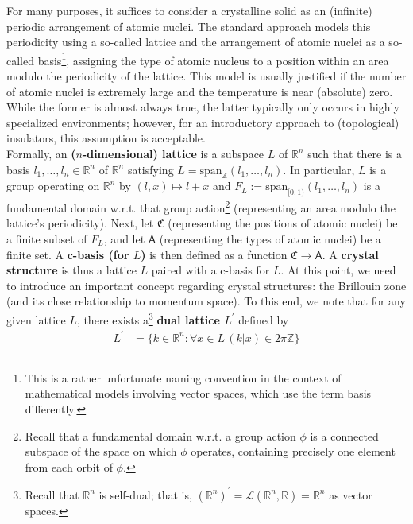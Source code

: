 For many purposes, it suffices to consider a crystalline solid as an (infinite) periodic arrangement of atomic nuclei.
The standard approach models this periodicity using a so-called lattice and the arrangement of atomic nuclei as a so-called basis\footnote{This is a rather unfortunate naming convention in the context of mathematical models involving vector spaces, which use the term {\glqq}basis{\grqq} differently.}, assigning the type of atomic nucleus to a position within an area modulo the periodicity of the lattice.
This model is usually justified if the number of atomic nuclei is extremely large and the temperature is near (absolute) zero.
While the former is almost always true, the latter typically only occurs in highly specialized environments; however, for an introductory approach to (topological) insulators, this assumption is acceptable.
\\
Formally, an \textbf{($n$-dimensional) lattice} is a subspace $L$ of $\mathbb{R}^{n}$ such that there is a basis $l_{1},\ldots,l_{n} \in \mathbb{R}^{n}$ of $\mathbb{R}^{n}$ satisfying $L = \mathrm{span}_{\mathbb{Z}}(l_{1},\ldots,l_{n})$. In particular, $L$ is a group operating on $\mathbb{R}^{n}$ by $(l,x) \mapsto l + x$ and $F_{L} := \mathrm{span}_{[0,1)}(l_{1},\ldots,l_{n})$ is a fundamental domain w.r.t. that group action\footnote{Recall that a fundamental domain w.r.t. a group action $\phi$ is a connected subspace of the space on which $\phi$ operates, containing precisely one element from each orbit of $\phi$.} (representing an area modulo the lattice's periodicity).
Next, let $\mathfrak{C}$ (representing the positions of atomic nuclei) be a finite subset of $F_{L}$, and let $\mathsf{A}$ (representing the types of atomic nuclei) be a finite set. A \textbf{c-basis (for $L$)} is then defined as a function $\mathfrak{C} \to \mathsf{A}$.
A \textbf{crystal structure} is thus a lattice $L$ paired with a c-basis for $L$.
At this point, we need to introduce an important concept regarding crystal structures: the Brillouin zone (and its close relationship to momentum space).
To this end, we note that for any given lattice $L$, there exists a\footnote{Recall that $\mathbb{R}^{n}$ is self-dual; that is, $(\mathbb{R}^{n})^{\prime}= \mathcal{L}(\mathbb{R}^{n},\mathbb{R}) = \mathbb{R}^{n}$ as vector spaces.} \textbf{dual lattice $L^{\prime}$} defined by
\begin{align*}
  L^{\prime}
  &=
  \lbrace
      k
      \in
      \mathbb{R}^{n}
    \colon
      \forall
      x
      \in
      L
      \,
      (k \vert x)
      \in 
      2\pi
      \mathbb{Z}
  \rbrace
\end{align*}
